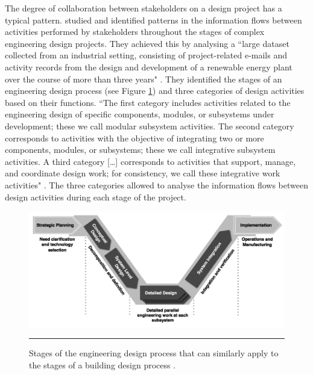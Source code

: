 The degree of collaboration between stakeholders on a design project has a typical pattern.
\cite{Parraguez2015} studied and identified patterns in the information flows between activities performed by stakeholders throughout the stages of complex engineering design projects.
They achieved this by analysing a ``large dataset collected from an industrial setting, consisting of project-related e-mails and activity records from the design and development of a renewable energy plant over the course of more than three years" \citep[p.~604]{Parraguez2015}.
They identified the stages of an engineering design process (see Figure \ref{fig_Parraguez_stages}) and three categories of design activities based on their functions.
``The first category includes activities related to the engineering design of specific components, modules, or subsystems under development; these we call modular subsystem activities.
The second category corresponds to activities with the objective of integrating two or more components, modules, or subsystems; these we call integrative subsystem activities.
A third category [\ldots] corresponds to activities that support, manage, and coordinate design work; for consistency, we call these integrative work activities" \citep[pp.~605--606]{Parraguez2015}.
The three categories allowed \citeauthor{Parraguez2015} to analyse the information flows between design activities  during each stage of the project.


\begin{figure}[tbp]
	\centering
	\includegraphics[width=\textwidth]{figures/Parraguez_stages.png}
	\rule{\textwidth}{0.5pt} %
	\caption[Stages of the engineering design process.]{Stages of the engineering design process that can similarly apply to the stages of a building design process \citep[Figure~1]{Parraguez2015}.}
	\label{fig_Parraguez_stages}
\end{figure}


